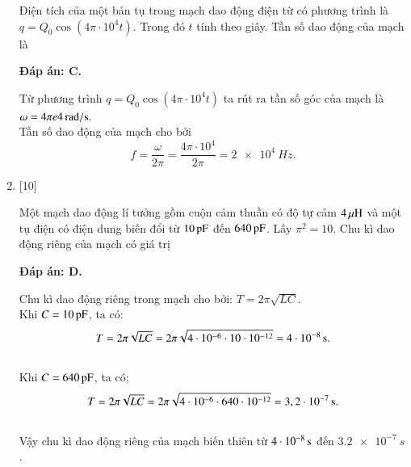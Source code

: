\begin{enumerate}[label=\bfseries Câu \arabic*:]
	{Điện tích của một bản tụ trong mạch dao động điện từ có phương trình là $q = Q_0 \cos \left( 4\pi \cdot 10^{4}t \right)$. Trong đó $t$ tính theo giây. Tần số dao động của mạch là
	}
	
	\hideall
	{		\textbf{Đáp án: C.}
		
		Từ phương trình $q = Q_0 \cos \left( 4\pi \cdot 10^{4}t \right)$ ta rút ra tần số góc của mạch là $\omega = \xsi{4 \pi e4}{rad/s}.$ \\
		Tần số dao động của mạch cho bởi
		$$f = \dfrac{\omega}{2\pi} = \dfrac{4\pi \cdot 10^{4}}{2\pi} = \SI{2 e4}{Hz}.$$
		
	}
	
	\item {} [10] %
	
	{Một mạch dao động lí tưởng gồm cuộn cảm thuần có độ tự cảm $\xsi{4}{\mu H}$ và một tụ điện có điện dung biến đổi từ $\xsi{10}{pF}$ đến $\xsi{640}{pF}$. Lấy $\pi^2 = 10$. Chu kì dao động riêng của mạch có giá trị
	}
	
	\hideall
	{		\textbf{Đáp án: D.}
		
		Chu kì dao động riêng trong mạch cho bởi: $T = 2\pi \sqrt{LC}$. \\
		Khi $C = \xsi{10}{pF}$, ta có:
		$$
		T = 2\pi \sqrt{LC} = 2\pi \sqrt{4\cdot10^{-6} \cdot 10\cdot10^{-12}} = \xsi{4\cdot10^{-8}}{s}.
		$$ \\
		Khi $C = \xsi{640}{pF}$, ta có;
		$$
		T = 2\pi \sqrt{LC} = 2\pi \sqrt{4\cdot10^{-6} \cdot 640\cdot10^{-12}} = \xsi{3,2\cdot10^{-7}}{s}.
		$$ \\
		Vậy chu kì dao động riêng của mạch biến thiên từ $\xsi{4\cdot10^{-8}}{s}$ đến $\SI{3,2 e-7}{s}$.
	}
	

\end{enumerate}
